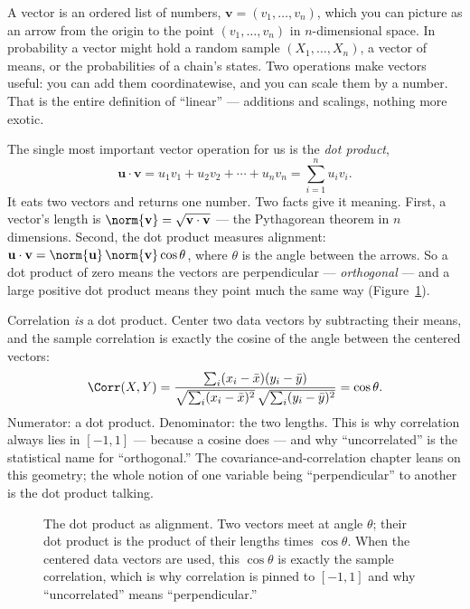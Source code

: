 A vector is an ordered list of numbers, $\mathbf{v}=(v_1,\dots,v_n)$, which you can picture as an
arrow from the origin to the point $(v_1,\dots,v_n)$ in $n$-dimensional space. In probability a vector
might hold a random sample $(X_1,\dots,X_n)$, a vector of means, or the probabilities of a chain's
states. Two operations make vectors useful: you can add them coordinatewise, and you can scale them by
a number. That is the entire definition of ``linear'' --- additions and scalings, nothing more exotic.

The single most important vector operation for us is the \emph{dot product},
\[
  \mathbf{u}\cdot\mathbf{v} = u_1 v_1 + u_2 v_2 + \cdots + u_n v_n = \sum_{i=1}^n u_i v_i.
\]
It eats two vectors and returns one number. Two facts give it meaning. First, a vector's length is
$\norm{\mathbf{v}} = \sqrt{\mathbf{v}\cdot\mathbf{v}}$ --- the Pythagorean theorem in $n$ dimensions.
Second, the dot product measures alignment: $\mathbf{u}\cdot\mathbf{v} =
\norm{\mathbf{u}}\,\norm{\mathbf{v}}\cos\theta$, where $\theta$ is the angle between the arrows. So a
dot product of zero means the vectors are perpendicular --- \emph{orthogonal} --- and a large positive
dot product means they point much the same way (Figure~\ref{chAcla:fig-dotproduct}).

\begin{happeningbox}
Correlation \emph{is} a dot product. Center two data vectors by subtracting their means, and the
sample correlation is exactly the cosine of the angle between the centered vectors:
\[
  \Corr(X,Y) = \frac{\sum_i (x_i-\bar x)(y_i-\bar y)}
                    {\sqrt{\sum_i (x_i-\bar x)^2}\,\sqrt{\sum_i (y_i-\bar y)^2}}
            = \cos\theta.
\]
Numerator: a dot product. Denominator: the two lengths. This is why correlation always lies in
$[-1,1]$ --- because a cosine does --- and why ``uncorrelated'' is the statistical name for
``orthogonal.'' The covariance-and-correlation chapter leans on this geometry; the whole notion of one
variable being ``perpendicular'' to another is the dot product talking.
\end{happeningbox}

\begin{figure}[H]
\centering
{}
\caption{The dot product as alignment. Two vectors meet at angle $\theta$; their dot product is the
product of their lengths times $\cos\theta$. When the centered data vectors are used, this $\cos\theta$
is exactly the sample correlation, which is why correlation is pinned to $[-1,1]$ and why
``uncorrelated'' means ``perpendicular.''}
\label{chAcla:fig-dotproduct}
\end{figure}

